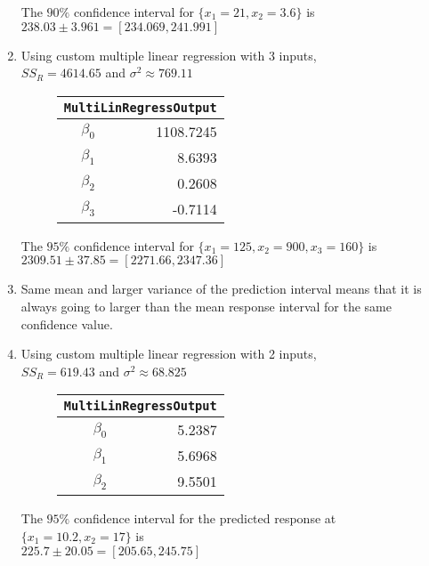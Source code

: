 \begin{enumerate}
The $ 90\% $ confidence interval for $ \{x_1 = 21, x_2 = 3.6\} $ is \\
$ 238.03 \pm 3.961 = [234.069, 241.991]$

\item Using custom multiple linear regression with 3 inputs, \\
$ SS_R = 4614.65 $ and $ \sigma^2 \approx 769.11 $

\begin{figure}[H]
	\centering
	\begin{tabular}{@{}rr@{}}
		\toprule
		\multicolumn{2}{c}{\texttt{MultiLinRegressOutput}} \\
		\midrule
		$\beta_0$ &        1108.7245 \\
		$\beta_1$ &           8.6393 \\
		$\beta_2$ &           0.2608 \\
		$\beta_3$ &          -0.7114 \\
		\bottomrule
	\end{tabular}
	
\end{figure}

The $ 95\% $ confidence interval for $ \{x_1 = 125, x_2 = 900, x_3 = 160\} $ is \\
$ 2309.51 \pm 37.85 = [2271.66, 2347.36]$

\item Same mean and larger variance of the prediction interval means that it is always going to larger than the mean response interval for the same confidence value.\\

\item Using custom multiple linear regression with 2 inputs, \\
$ SS_R = 619.43 $ and $ \sigma^2 \approx 68.825 $
\begin{figure}[H]
	\centering
	\begin{tabular}{@{}rr@{}}
		\toprule
		\multicolumn{2}{c}{\texttt{MultiLinRegressOutput}} \\
		\midrule
		$\beta_0$ &           5.2387 \\
		$\beta_1$ &           5.6968 \\
		$\beta_2$ &           9.5501 \\
		\bottomrule
	\end{tabular}
\end{figure}

The $ 95\% $ confidence interval for the predicted response at $ \{x_1 = 10.2, x_2 = 17\} $ is \\
$ 225.7 \pm 20.05 = [205.65, 245.75]$



\end{enumerate}
